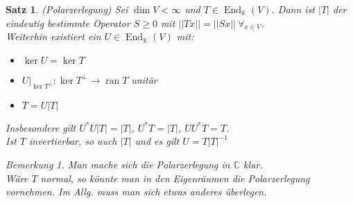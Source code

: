 \documentclass[12pt,a4paper]{article}
\newtheorem{theorem}{Satz}
\theoremstyle{definition}
\theoremstyle{remark}
\newtheorem*{remark}{Bemerkung}
\DeclareMathOperator{\End}{End}
\DeclareMathOperator{\ran}{ran}
\begin{document}
	\newpage
	\begin{theorem}{(Polarzerlegung)}
		Sei $\dim V < \infty$ und $T \in \End_{\mathbb{K}}(V)$. Dann ist $|T|$ der eindeutig bestimmte Operator $S \geq 0$ mit $||Tx||=||Sx|| \ \forall_{x \in V}$. \\
		Weiterhin existiert ein $U \in \End_{\mathbb{K}}(V)$ mit:
		\begin{itemize}
			\item $\ker U=\ker T$ 
			\item $U|_{\ker T^{\bot}}: \ker T^{\bot} \rightarrow \ran T$ unitär
			\item $T=U|T|$
		\end{itemize}
		Insbesondere gilt $U^*U|T|=|T|$, $U^*T=|T|$, $UU^*T=T$. \\
		Ist $T$ invertierbar, so auch $|T|$ und es gilt $U = T|T|^{-1}$
		\begin{remark}
			Man mache sich die Polarzerlegung in $\mathbb{C}$ klar. \\
			Wäre $T$ normal, so könnte man in den Eigenräumen die Polarzerlegung vornehmen. Im Allg. muss man sich etwas anderes überlegen.
		\end{remark}
	\end{theorem}
\end{document}
